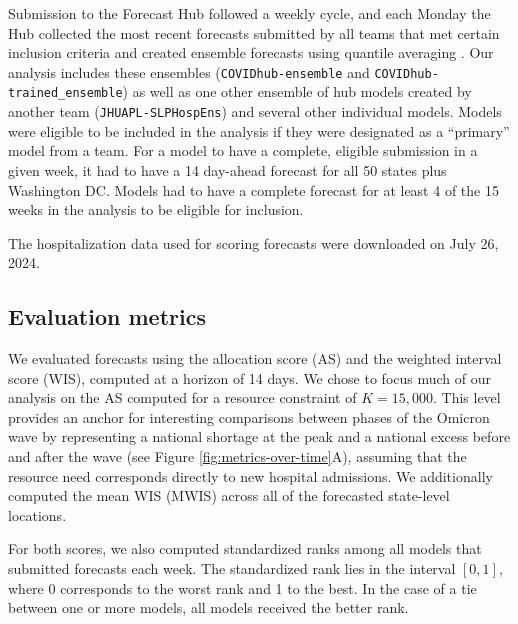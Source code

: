 \documentclass{article}\usepackage[]{graphicx}\usepackage[]{xcolor}
\begin{document}
Submission to the Forecast Hub followed a weekly cycle, and each Monday the Hub collected the most recent forecasts
submitted by all teams that met certain inclusion criteria and created ensemble forecasts using quantile averaging
\citep{ray_comparing_2023}. Our analysis includes these ensembles (\texttt{COVIDhub-ensemble} and
\texttt{COVIDhub-trained\_ensemble}) as well as one other ensemble of hub models created by another team
(\texttt{JHUAPL-SLPHospEns}) and several other individual models. Models were eligible to be included in the analysis if
they were designated as a ``primary'' model from a team. For a model to have a complete, eligible submission in a given
week, it had to have a 14 day-ahead forecast for all 50 states plus Washington DC. Models had to have a complete
forecast for at least 4 of the 15 weeks in the analysis to be eligible for inclusion.



The hospitalization data used for scoring forecasts were downloaded on July 26, 2024.

\subsection{Evaluation metrics}

We evaluated forecasts using the allocation score (AS) and the weighted interval score (WIS), computed at a horizon of
14 days. We chose to focus much of our analysis on the AS computed for a resource constraint of $K=15,000$. This level
provides an anchor for interesting comparisons between phases of the Omicron wave by representing a national shortage at
the peak and a national excess before and after the wave (see Figure \ref{fig:metrics-over-time}A), assuming that the
resource need corresponds directly to new hospital admissions. We additionally computed the mean WIS (MWIS) across all
of the forecasted state-level locations. 

For both scores, we also computed standardized ranks among all models that submitted forecasts each week. The
standardized rank lies in the interval $[0, 1]$, where 0 corresponds to the worst rank and 1 to the best. In the case of
a tie between one or more models, all models received the better rank.
\end{document}
